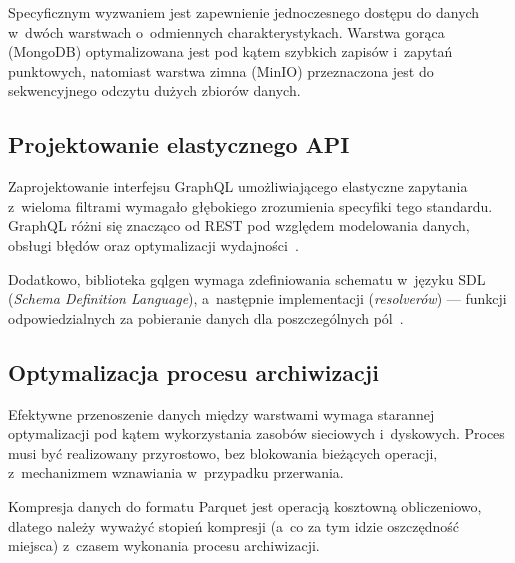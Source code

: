 Specyficznym wyzwaniem jest zapewnienie jednoczesnego dostępu do danych w~dwóch warstwach o~odmiennych
charakterystykach.
Warstwa gorąca (MongoDB) optymalizowana jest pod kątem szybkich zapisów i~zapytań punktowych, natomiast warstwa
zimna (MinIO) przeznaczona jest do sekwencyjnego odczytu dużych zbiorów danych.

\subsection{Projektowanie elastycznego API}
\label{subsec:projektowanie_api}

Zaprojektowanie interfejsu GraphQL umożliwiającego elastyczne zapytania z~wieloma filtrami wymagało głębokiego
zrozumienia specyfiki tego standardu.
GraphQL różni się znacząco od REST pod względem modelowania danych, obsługi błędów oraz optymalizacji wydajności~\cite{graphql_docs}.

Dodatkowo, biblioteka gqlgen wymaga zdefiniowania schematu w~języku SDL (\textit{Schema Definition Language}),
a~następnie implementacji (\textit{resolverów}) --- funkcji odpowiedzialnych za pobieranie danych dla poszczególnych pól~\cite{gqlgen_docs}.

\subsection{Optymalizacja procesu archiwizacji}
\label{subsec:optymalizacja_archiwizacji}

Efektywne przenoszenie danych między warstwami wymaga starannej optymalizacji pod kątem wykorzystania zasobów
sieciowych i~dyskowych.
Proces musi być realizowany przyrostowo, bez blokowania bieżących operacji, z~mechanizmem wznawiania w~przypadku
przerwania.

Kompresja danych do formatu Parquet jest operacją kosztowną obliczeniowo, dlatego należy wyważyć stopień kompresji
(a~co za tym idzie oszczędność miejsca) z~czasem wykonania procesu archiwizacji.


